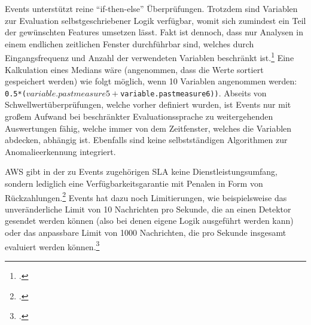 \label{anhang:vergleich-iot-events}

\AWSIOT{} Events unterstützt reine \enquote{if-then-else} Überprüfungen. Trotzdem sind Variablen zur Evaluation selbstgeschriebener Logik verfügbar, womit sich zumindest ein Teil der gewünschten Features umsetzen lässt. Fakt ist dennoch, dass nur Analysen in einem endlichen zeitlichen Fenster durchführbar sind, welches durch Eingangsfrequenz und Anzahl der verwendeten Variablen beschränkt ist.\footcite[Vgl.][]{AmazonWebServicesInc..o.J.am} Eine Kalkulation eines Medians wäre (angenommen, dass die Werte sortiert gespeichert werden) wie folgt möglich, wenn 10 Variablen angenommen werden: \texttt{0.5*($variable.pastmeasure5 + $variable.pastmeasure6))}.
Abseits von Schwellwertüberprüfungen, welche vorher definiert wurden, ist \AWSIOT{} Events nur mit großem Aufwand bei beschränkter Evaluationssprache zu weitergehenden Auswertungen fähig, welche immer von dem Zeitfenster, welches die Variablen abdecken, abhängig ist. Ebenfalls sind keine selbstständigen Algorithmen zur Anomalieerkennung integriert.

\ac{AWS} gibt in der zu \AWSIOT{} Events zugehörigen \ac{SLA} keine Dienstleistungsumfang, sondern lediglich eine Verfügbarkeitsgarantie mit Penalen in Form von Rückzahlungen.\footcite[Vgl.][]{AmazonWebServicesInc..o.J.an} \AWSIOT{} Events hat dazu noch Limitierungen, wie beispielsweise das unveränderliche Limit von 10 Nachrichten pro Sekunde, die an einen Detektor gesendet werden können (also bei denen eigene Logik ausgeführt werden kann) oder das anpassbare Limit von 1000 Nachrichten, die pro Sekunde insgesamt evaluiert werden können.\footcite[Vgl.][]{AmazonWebServicesInc..o.J.ap}


\label{anhang:vergleich-kinesis}


